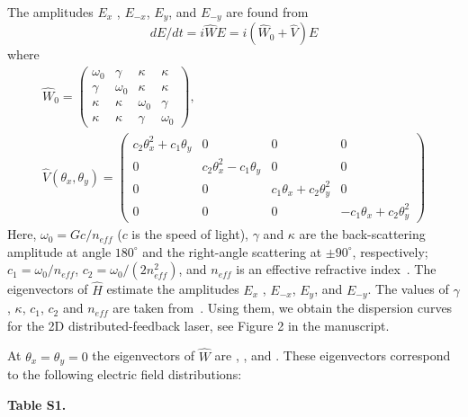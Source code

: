 \documentclass[aps,pra,amsmath,amssymb,onecolumn,superscriptaddress,showpacs,floatfix,]{revtex4-1}
\begin{document}
The amplitudes  ${E_x}$ , ${E_{ - x}}$,  ${E_y}$, and ${E_{ - y}}$ are found from
\begin{equation}
dE/dt = i\hat WE = i\left( {{{\hat W}_0} + \hat V} \right)E\tag{6}
\end{equation}
where 
\begin{equation}
\begin{array}{l}
{\hat W_0} = \left( {\begin{array}{*{20}{c}}
	{{\omega _0}}&\gamma &\kappa &\kappa \\
	\gamma &{{\omega _0}}&\kappa &\kappa \\
	\kappa &\kappa &{{\omega _0}}&\gamma \\
	\kappa &\kappa &\gamma &{{\omega _0}}
	\end{array}} \right) , \\
\hat V\left( {{\theta _x},{\theta _y}} \right) = \left( {\begin{array}{*{20}{c}}
	{{c_2}\theta _x^2 + {c_1}{\theta _y}}&0&0&0\\
	0&{{c_2}\theta _x^2 - {c_1}{\theta _y}}&0&0\\
	0&0&{{c_1}{\theta _x} + {c_2}\theta _y^2}&0\\
	0&0&0&{ - {c_1}{\theta _x} + {c_2}\theta _y^2}
	\end{array}} \right)\tag{7}
\end{array}
\end{equation}
Here, ${\omega _0} = Gc/{n_{eff}}$ ($c$ is the speed of light), $\gamma $  and $\kappa$  are the back-scattering amplitude at angle $180^{\circ }$ and the right-angle scattering at $\pm 90^{\circ }$, respectively; ${c_1} = {\omega _0}/{n_{eff}}$, ${c_2} = {\omega _0}/\left( {2n_{eff}^2} \right)$, and ${n_{eff}}$  is an effective refractive index~\cite{ExterOptExp,TennerJOpt}.
The eigenvectors of $\hat H$  estimate the amplitudes ${E_x}$ , ${E_{ - x}}$,  ${E_y}$, and ${E_{ - y}}$.
The values of $\gamma $, $\kappa$, $c_1$, $c_2$ and $n_{eff}$ are taken from~\cite{TennerJOpt}.
Using them, we obtain the dispersion curves for the 2D distributed-feedback laser, see Figure 2 in the manuscript.

At $\theta _x = \theta _y = 0$ the eigenvectors of $\hat W$ are , ,  and . 
These eigenvectors correspond to the following electric field distributions:

\textbf{Table S1.}
\end{document}
